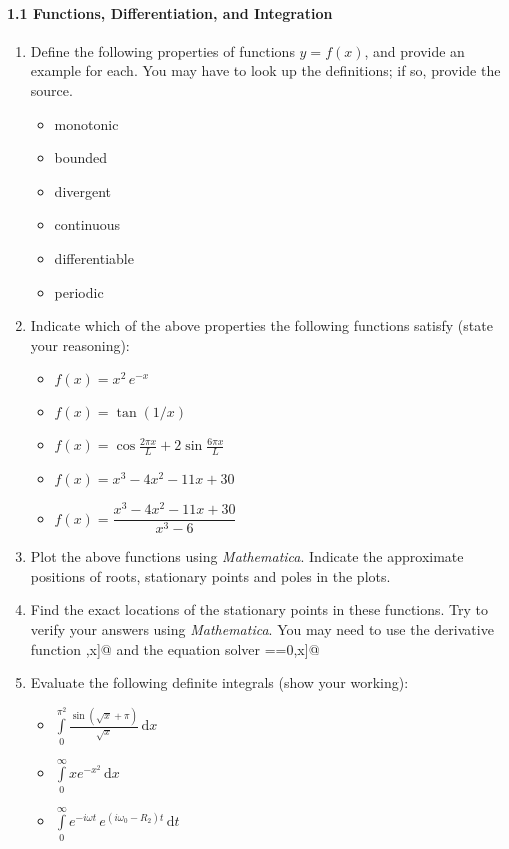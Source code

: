\documentclass{chem6155problemset}
\begin{document}
\paragraph{1.1 Functions, Differentiation, and Integration}
\begin{enumerate}
 	\item Define the following properties of functions $y=f(x)$, and provide an example for each. You
	may have to look up the definitions; if so, provide the source.
	  \begin{itemize}
	  	\item monotonic
		\item bounded
		\item divergent
		\item continuous
		\item differentiable
		\item periodic
	  \end{itemize}
	  
	 \item Indicate which of the above properties the following functions satisfy (state
	 your reasoning):
	 	\begin{itemize}
			\item $f(x)=x^2\,e^{-x}$
			\item $f(x)=\tan(1/x)$
			\item $f(x)=\cos\frac{2\pi x}{L} + 2 \sin\frac{6\pi x}{L}$
			\item $f(x) = x^3-4x^2-11x+30$
			\item $f(x) = \dfrac{x^3-4x^2-11x+30}{x^3-6}$
		\end{itemize}
		
	\item Plot the above functions using \emph{Mathematica}. Indicate the approximate 
	positions of roots, stationary points and poles in the plots.
	
	\item Find the exact locations of the stationary points in these functions. 
	Try to verify your answers using \emph{Mathematica}. You may need to use
	the derivative function \verb@D[f[x],x]@ and the equation solver \verb@Solve[f[x]==0,x]@
	 
	 
	\item Evaluate the following definite integrals (show your working):
	 \begin{itemize}
	 	\item $\displaystyle\int\limits_0^{\pi^2} \frac{\sin(\sqrt{x}+\pi)}{\sqrt{x}}\,\mathrm{d}x$
		\item $\displaystyle\int\limits_0^\infty x e^{-x^2}\,\mathrm{d}x$
		\item $\displaystyle\int\limits_{0}^{\infty} e^{-i\omega t} \, e^{(i\omega_0-R_2) t}\,\mathrm{d}t$
	 \end{itemize}
	 

\end{enumerate}
\end{document}
